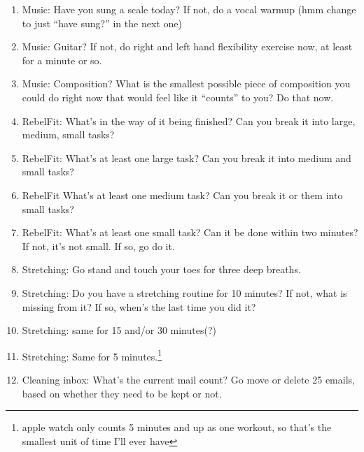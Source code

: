 \documentclass[12pt]{article}
\newcommand{\say}[1]{``#1''}
\renewcommand{\,}{\textsuperscript{,}}
\begin{document}
\begin{enumerate}
\begin{itemize}
\item Old serial(s): What's the status of plotting out the rest of the book?

\item Old serial(s): What's the status of writing the rest of it?

\end{itemize}

\item Music: Have you sung a scale today? If not, do a vocal warmup (hmm change to just \say{have sung?} in the next one)

\item Music: Guitar? If not, do right and left hand flexibility exercise now, at least for a minute or so.

\item Music: Composition? What is the smallest possible piece of composition you could do right now that would feel like it \say{counts} to you? Do that now.

\item RebelFit: What's in the way of it being finished? Can you break it into large, medium, small tasks?

\item RebelFit: What's at least one large task? Can you break it into medium and small tasks?

\item RebelFit What's at least one medium task? Can you break it or them into small tasks?

\item RebelFit: What's at least one small task? Can it be done within two minutes? If not, it's not small. If so, go do it.

\item Stretching: Go stand and touch your toes for three deep breaths.

\item Stretching: Do you have a stretching routine for 10 minutes? If not, what is missing from it? If so, when's the last time you did it?

\item Stretching: same for 15 and/or 30 minutes(?)

\item Stretching: Same for 5 minutes.\footnote{apple watch only counts 5 minutes and up as one workout, so that's the smallest unit of time I'll ever have}

\item Cleaning inbox: What's the current mail count? Go move or delete 25 emails, based on whether they need to be kept or not.


\end{enumerate}
\end{document}
